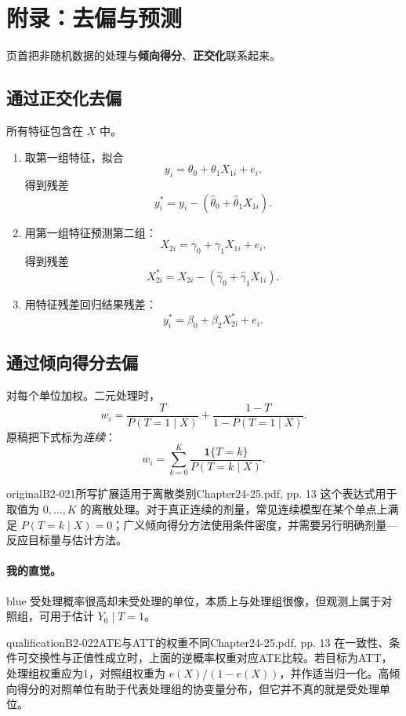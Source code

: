 \section{附录：去偏与预测}
页首把非随机数据的处理与\textbf{倾向得分}、\textbf{正交化}联系起来。
\subsection{通过正交化去偏}
 所有特征包含在 \(X\) 中。
\begin{enumerate}
\item 取第一组特征，拟合
\[
y_i=\theta_0+\theta_1X_{1i}+e_i.
\]
得到残差
\[
y_i^*=y_i-(\widehat\theta_0+\widehat\theta_1X_{1i}).
\]
\item 用第一组特征预测第二组：
\[
X_{2i}=\gamma_0+\gamma_1X_{1i}+e_i.
\]
得到残差
\[
X_{2i}^*=X_{2i}-(\widehat\gamma_0+\widehat\gamma_1X_{1i}).
\]
\item 用特征残差回归结果残差：
\[
y_i^*=\beta_0+\beta_2X_{2i}^*+e_i.
\]
\end{enumerate}

\subsection{通过倾向得分去偏}
 对每个单位加权。二元处理时，
\[
w_i=\frac{T}{P(T=1\mid X)}+\frac{1-T}{1-P(T=1\mid X)}.
\]
原稿把下式标为\emph{连续}：
\[
w_i=\sum_{k=0}^{K}\frac{\mathbf1\{T=k\}}{P(T=k\mid X)}.
\]
\begin{reviewnote}{original}{B2-021}{所写扩展适用于离散类别}{Chapter24-25.pdf, pp. 13}
这个表达式用于取值为 \(0,\ldots,K\) 的离散处理。对于真正连续的剂量，常见连续模型在某个单点上满足 \(P(T=k\mid X)=0\)；广义倾向得分方法使用条件密度，并需要另行明确剂量—反应目标量与估计方法。
\par{}
\end{reviewnote}


\paragraph{我的直觉。}
\begin{inkblock}{blue}
受处理概率很高却未受处理的单位，本质上与处理组很像，但观测上属于对照组，可用于估计 \(Y_0\mid T=1\)。
\end{inkblock}\begin{reviewnote}{qualification}{B2-022}{ATE与ATT的权重不同}{Chapter24-25.pdf, pp. 13}
在一致性、条件可交换性与正值性成立时，上面的逆概率权重对应ATE比较。若目标为ATT，处理组权重应为1，对照组权重为 \(e(X)/(1-e(X))\)，并作适当归一化。高倾向得分的对照单位有助于代表处理组的协变量分布，但它并不真的就是受处理单位。
\par{}
\end{reviewnote}

